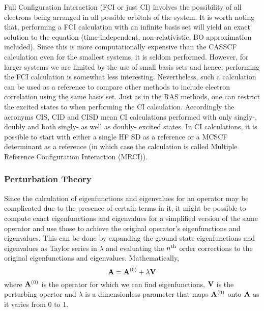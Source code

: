             Full Configuration Interaction (FCI or just CI) involves the possibility of all electrons being arranged in all possible orbitals of the system. It is worth noting that, performing a FCI calculation with an infinite basis set will yield an exact solution to the \Schrodinger{} equation (time-independent, non-relativistic, BO approximation included). Since this is more computationally expensive than the CASSCF calculation even for the smallest systems, it is seldom performed. However, for larger systems we are limited by the use of small basis sets and hence, performing the FCI calculation is somewhat less interesting. Nevertheless, such a calculation can be used as a reference to compare other methods to include electron correlation using the same basis set. Just as in the RAS methods, one can restrict the excited states to when performing the CI calculation. Accordingly the acronyms CIS, CID and CISD mean CI calculations performed with only singly-, doubly and both singly- as well as doubly- excited states. In CI calculations, it is possible to start with either a single HF SD as a reference or a MCSCF determinant as a reference (in which case the calculation is called Multiple Reference Configuration Interaction (MRCI)).

            \subsubsection{Perturbation Theory}
                Since the calculation of eigenfunctions and eigenvalues for an operator may be complicated due to the presence of certain terms in it, it might be possible to compute exact eigenfunctions and eigenvalues for a simplified version of the same operator and use those to achieve the original operator's eigenfunctions and eigenvalues. This can be done by expanding the ground-state eigenfunctions and eigenvalues as Taylor series in $\lambda$ and evaluating the $n^{\rm th}$ order corrections to the original eigenfunctions and eigenvalues. Mathematically,
                \begin{equation}\label{eq:perturbation theory}
                    {\mathbf {A}} = {\mathbf {A}}^{(0)} + \lambda {\mathbf {V}}
                \end{equation}
                where ${\mathbf {A}}^{(0)}$ is the operator for which we can find eigenfunctions, ${\mathbf {V}}$ is the perturbing opertor and $\lambda$ is a dimensionless parameter that maps ${\mathbf {A}}^{(0)}$ onto ${\mathbf {A}}$ as it varies from 0 to 1.

